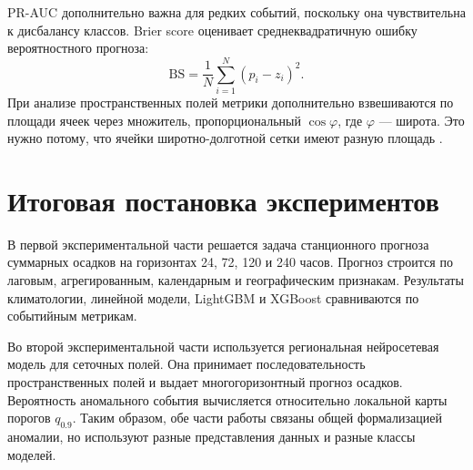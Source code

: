 PR-AUC дополнительно важна для редких событий, поскольку она чувствительна к дисбалансу классов. Brier score оценивает среднеквадратичную ошибку вероятностного прогноза:
\[
    \mathrm{BS} = \frac{1}{N}\sum_{i=1}^{N}(p_i-z_i)^2.
\]
При анализе пространственных полей метрики дополнительно взвешиваются по площади ячеек через множитель, пропорциональный \(\cos\varphi\), где \(\varphi\) — широта. Это нужно потому, что ячейки широтно-долготной сетки имеют разную площадь \cite{weatherbench2}.

\section{Итоговая постановка экспериментов}

В первой экспериментальной части решается задача станционного прогноза суммарных осадков на горизонтах 24, 72, 120 и 240 часов. Прогноз строится по лаговым, агрегированным, календарным и географическим признакам. Результаты климатологии, линейной модели, LightGBM и XGBoost сравниваются по событийным метрикам.

Во второй экспериментальной части используется региональная нейросетевая модель для сеточных полей. Она принимает последовательность пространственных полей и выдает многогоризонтный прогноз осадков. Вероятность аномального события вычисляется относительно локальной карты порогов \(q_{0.9}\). Таким образом, обе части работы связаны общей формализацией аномалии, но используют разные представления данных и разные классы моделей.

